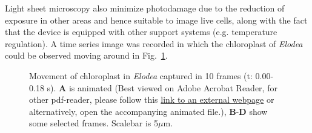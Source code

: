 Light sheet microscopy also minimize photodamage due to the reduction of exposure in other areas and hence suitable to image live cells, along with the fact that the device is equipped with other support systems (e.g. temperature regulation). 
A time series image was recorded in which the chloroplast of \textit{Elodea} could be observed moving around in Fig.~\ref{fig:Elomov}. 
\\
\begin{figure}[h]
\centering
{}\hspace{0.1mm}
\hspace{0.1mm}
\hspace{0.1mm}
\caption{Movement of chloroplast in \textit{Elodea} captured in 10 frames (t: 0.00-0.18 s). 
\textbf{A} is animated (Best viewed on Adobe Acrobat Reader, for other pdf-reader, please follow this \href{https://imgur.com/a/VyLE9jk}{link to an external webpage} or alternatively, open the accompanying animated file.), \textbf{B}-\textbf{D} show some selected frames. 
Scalebar is 5$\mu$m.} %
\label{fig:Elomov}
\end{figure}


\renewcommand{\refname}{\spacedlowsmallcaps{References}} %

%


